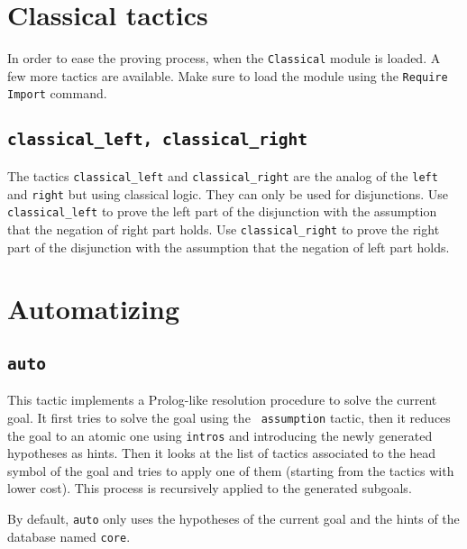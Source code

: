 \section[Classical tactics]{Classical tactics\label{ClassicalTactics}}

In order to ease the proving process, when the {\tt Classical} module is loaded. A few more tactics are available. Make sure to load the module using the \texttt{Require Import} command.

\subsection{{\tt classical\_left, classical\_right}  }

The tactics \texttt{classical\_left} and \texttt{classical\_right} are the analog of the \texttt{left} and \texttt{right} but using classical logic. They can only be used for disjunctions.
Use  \texttt{classical\_left} to prove the left part of the disjunction with the assumption that the negation of right part holds. 
Use \texttt{classical\_right} to prove the right part of the disjunction with the assumption that the negation of left part holds. 

\section{Automatizing
\label{Automatizing}}

\subsection{\tt auto
\label{auto}
}

This tactic implements a Prolog-like resolution procedure to solve the
current goal. It first tries to solve the goal using the {\tt
  assumption} tactic, then it reduces the goal to an atomic one using
{\tt intros} and introducing the newly generated hypotheses as hints.
Then it looks at the list of tactics associated to the head symbol of
the goal and tries to apply one of them (starting from the tactics
with lower cost). This process is recursively applied to the generated
subgoals. 

By default, \texttt{auto} only uses the hypotheses of the current goal and the
hints of the database named {\tt core}. 

